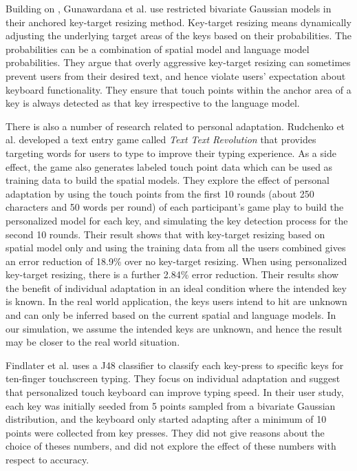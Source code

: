 \documentclass{sigchi}
\begin{document}
Building on \cite{Goodman:2002}, Gunawardana et al. \cite{Gunawardana:2010} use restricted bivariate Gaussian
models in their anchored key-target resizing method. Key-target resizing means dynamically
adjusting the underlying target areas of the keys based on their probabilities. The probabilities can 
be a combination of spatial model and language model probabilities.
They argue that overly aggressive
key-target resizing can sometimes prevent users from their desired text, and hence violate
users' expectation about keyboard functionality. They ensure that touch points within
the anchor area of a key is always detected as that key irrespective to the language model.

There is also a number of research related to personal adaptation. 
Rudchenko et al. \cite{Rudchenko:2011}
developed a text entry game called \textit{Text Text Revolution} that provides 
targeting words for users to type to improve their typing experience. As a side effect,
the game also generates labeled touch point data which can be used as
training data to build the spatial models. They explore the effect of personal adaptation
by using the touch points from the first 10 rounds (about 250 characters and 50 words per round) of each 
participant's game play to build the personalized model for each key, and simulating the key detection
process for the second 10 rounds. Their result shows that with key-target resizing based on
spatial model only and using the training data from all the users combined
gives an error reduction of 18.9\% over no key-target resizing. When using personalized
key-target resizing, there is a further 2.84\% error reduction.
Their results show the benefit of individual adaptation in an ideal condition where the 
intended key is known. In the real world application, the keys users intend to hit are unknown and
can only be inferred based on the current spatial and language models. In our simulation, we assume the 
intended keys are unknown, and hence the result may be closer to the real world situation. 

Findlater et al. \cite{Findlater:2012} uses a J48 classifier to classify
each key-press to specific keys for ten-finger touchscreen typing. They
focus on individual adaptation and suggest that personalized touch keyboard
 can improve typing speed.  
In their user study, each key was initially seeded from 5 points sampled from
a bivariate Gaussian distribution, and the keyboard only started adapting
after a minimum of 10 points were collected from key presses. They did not
give reasons about the choice of theses numbers, and did not explore the
effect of these numbers with respect to accuracy. 
\end{document}
